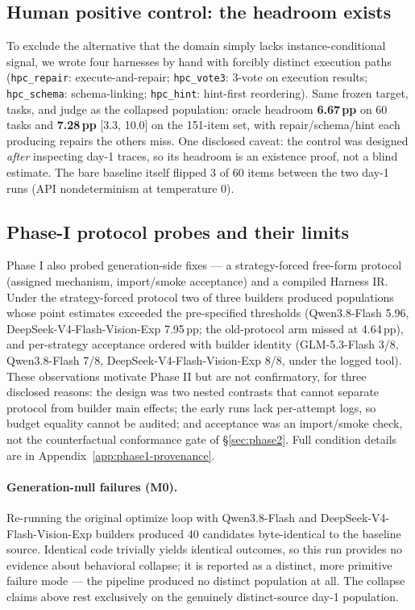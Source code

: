 \subsection{Human positive control: the headroom exists}\label{sec:positive}
To exclude the alternative that the domain simply lacks
instance-conditional signal, we wrote four harnesses by hand with forcibly
distinct execution paths (\texttt{hpc\_repair}: execute-and-repair;
\texttt{hpc\_vote3}: 3-vote on execution results; \texttt{hpc\_schema}:
schema-linking; \texttt{hpc\_hint}: hint-first reordering). Same frozen
target, tasks, and judge as the collapsed population: oracle headroom
\textbf{6.67\,pp} on 60 tasks and \textbf{7.28\,pp} {[}3.3, 10.0{]} on the
151-item set, with repair/schema/hint each producing repairs the others
miss. One disclosed caveat: the control was designed \emph{after}
inspecting day-1 traces, so its headroom is an existence proof, not a blind
estimate. The bare baseline itself flipped 3 of 60 items between the two
day-1 runs (API nondeterminism at temperature 0).

\subsection{Phase-I protocol probes and their limits}\label{sec:phase1probes}
Phase I also probed generation-side fixes --- a strategy-forced free-form protocol
(assigned mechanism, import/smoke acceptance) and a compiled Harness IR. Under the
strategy-forced protocol two of three builders produced populations whose point
estimates exceeded the pre-specified thresholds (Qwen3.8-Flash 5.96,
DeepSeek-V4-Flash-Vision-Exp 7.95\,pp; the old-protocol arm missed at
4.64\,pp), and per-strategy acceptance ordered with builder identity
(GLM-5.3-Flash 3/8, Qwen3.8-Flash 7/8, DeepSeek-V4-Flash-Vision-Exp 8/8,
under the logged tool). These
observations motivate Phase II but are not confirmatory, for three disclosed reasons:
the design was two nested contrasts that cannot separate protocol from builder main
effects; the early runs lack per-attempt logs, so budget equality cannot be audited;
and acceptance was an import/smoke check, not the counterfactual conformance gate of
\S\ref{sec:phase2}. Full condition details are in Appendix~\ref{app:phase1-provenance}.

\paragraph{Generation-null failures (M0).} Re-running the original optimize loop
with Qwen3.8-Flash and DeepSeek-V4-Flash-Vision-Exp builders produced 40 candidates byte-identical to the
\bare{} baseline source. Identical code trivially yields identical outcomes, so this
run provides no evidence about behavioral collapse; it is reported as a distinct,
more primitive failure mode --- the pipeline produced no distinct population at all.
The collapse claims above rest exclusively on the genuinely distinct-source day-1
population.

